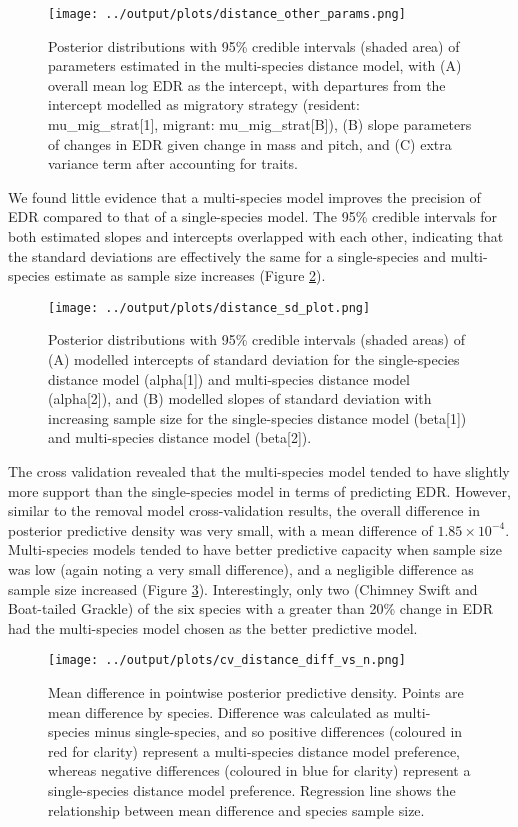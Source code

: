 \documentclass[12pt]{article}
\begin{document}
\begin{figure}[h!]
	\texttt{[image: ../output/plots/distance\_other\_params.png]}
	\caption{Posterior distributions with 95\% credible intervals (shaded area) of parameters estimated in the multi-species distance model, with (A) overall mean log EDR as the intercept, with departures from the intercept modelled as migratory strategy (resident: mu\_mig\_strat[1], migrant: mu\_mig\_strat[B]), (B) slope parameters of changes in EDR given change in mass and pitch, and (C) extra variance term after accounting for traits.}
	\label{fig:distance_params}
\end{figure}

\par We found little evidence that a multi-species model improves the precision of EDR compared to that of a single-species model.
The 95\% credible intervals for both estimated slopes and intercepts overlapped with each other, indicating that the standard deviations are effectively the same for a single-species and multi-species estimate as sample size increases (Figure \ref{fig:distance_sd}).

\begin{figure}[h!]
	\texttt{[image: ../output/plots/distance\_sd\_plot.png]}
	\caption{Posterior distributions with 95\% credible intervals (shaded areas) of (A) modelled intercepts of standard deviation for the single-species distance model (alpha[1]) and multi-species distance model (alpha[2]), and (B) modelled slopes of standard deviation with increasing sample size for the single-species distance model (beta[1]) and multi-species distance model (beta[2]).}
	\label{fig:distance_sd}
\end{figure}

\par The cross validation revealed that the multi-species model tended to have slightly more support than the single-species model in terms of predicting EDR.
However, similar to the removal model cross-validation results, the overall difference in posterior predictive density was very small, with a mean difference of $1.85 \times 10^{-4}$.
Multi-species models tended to have better predictive capacity when sample size was low (again noting a very small difference), and a negligible difference as sample size increased (Figure \ref{fig:distance_cv}).
Interestingly, only two (Chimney Swift and Boat-tailed Grackle) of the six species with a greater than 20\% change in EDR had the multi-species model chosen as the better predictive model.
\begin{figure}[h!]
	\texttt{[image: ../output/plots/cv\_distance\_diff\_vs\_n.png]}
	\caption{Mean difference in pointwise posterior predictive density. Points are mean difference by species. Difference was calculated as multi-species minus single-species, and so positive differences (coloured in red for clarity) represent a multi-species distance model preference, whereas negative differences (coloured in blue for clarity) represent a single-species distance model preference. Regression line shows the relationship between mean difference and species sample size.}
	\label{fig:distance_cv}
\end{figure}
\end{document}
